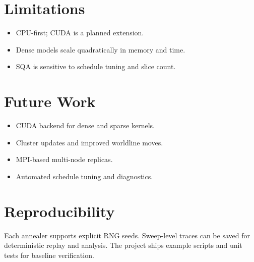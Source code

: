\documentclass[11pt]{article}
\begin{document}
\section{Limitations}
\begin{itemize}
\item CPU-first; CUDA is a planned extension.
\item Dense models scale quadratically in memory and time.
\item SQA is sensitive to schedule tuning and slice count.
\end{itemize}

\section{Future Work}
\begin{itemize}
\item CUDA backend for dense and sparse kernels.
\item Cluster updates and improved worldline moves.
\item MPI-based multi-node replicas.
\item Automated schedule tuning and diagnostics.
\end{itemize}

\section{Reproducibility}
Each annealer supports explicit RNG seeds. Sweep-level traces can be saved for deterministic replay and analysis. The project ships example scripts and unit tests for baseline verification.
\end{document}
